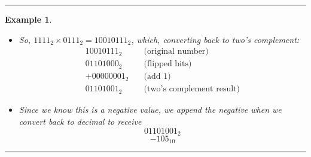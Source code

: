 \documentclass[12pt]{article}
\newtheorem{example}{Example}
\newenvironment{examp}
{\vspace{0.5cm}
 \hrule
\vspace{0.5cm}
\begin{example}}
{\hrule
\vspace{0.5cm}
\end{example}}
\begin{document}
\begin{examp}
\begin{itemize}
\[\begin{array}{c c c c c c c c c c c c c c c c c }
				       & 1 \times &  &  &  &  &   &   &   & 1 & 1 & 1 & 1 & 0 & 0 & 0 & 1 \\

				       & 1 \times &  &  &  &  &   &   & 1 & 1 & 1 & 1 & 0 & 0 & 0 & 1 &   \\
				       & 1 \times &  &  &  &  &   & 1 & 1 & 1 & 1 & 0 & 0 & 0 & 1 &   &   \\
				       & 0 \times &  &  &  &  & 0 & 0 & 0 & 0 & 0 & 0 & 0 & 0 &   &   &   \\
				      \hline
				       &          &  &  &  &  &   &   &   & 1 & 0 & 0 & 1 & 0 & 1 & 1 & 1 \\
			      \end{array}
		      \]
		      There really is no need to keep extending the partial products to the left, as the result is already well over our 8-bits.

		\item So, \(1111_2 \times 0111_2 = 10010111_2\), which, converting back to two's complement:
		      \[
			      \begin{aligned}
				      10010111_2   & \quad \text{(original number)}         \\
				      \hline
				      01101000_2   & \quad \text{(flipped bits)}            \\
				      + 00000001_2 & \quad \text{(add 1)}                   \\
				      \hline
				      01101001_2   & \quad \text{(two's complement result)}
			      \end{aligned}
		      \]
		\item Since we know this is a negative value, we append the negative when we convert back to decimal to receive
		      \[
			      01101001_2
		      \]
		      \[
			      -105_{10}
		      \]
	\end{itemize}
\end{examp}
\end{document}
